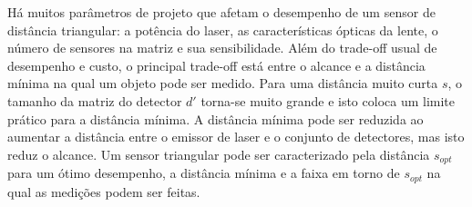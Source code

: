 Há muitos parâmetros de projeto que afetam o desempenho de um sensor de distância triangular: a potência do laser, as características ópticas da lente, o número de sensores na matriz e sua sensibilidade. Além do trade-off usual de desempenho e custo, o principal trade-off está entre o alcance e a distância mínima na qual um objeto pode ser medido. Para uma distância muito curta $s$, o tamanho da matriz do detector $d'$ torna-se muito grande e isto coloca um limite prático para a distância mínima. A distância mínima pode ser reduzida ao aumentar a distância entre o emissor de laser e o conjunto de detectores, mas isto reduz o alcance. Um sensor triangular pode ser caracterizado pela distância $s_{\textit{opt}}$ para um ótimo desempenho, a distância mínima e a faixa em torno de $s_{\textit{opt}}$ na qual as medições podem ser feitas.

